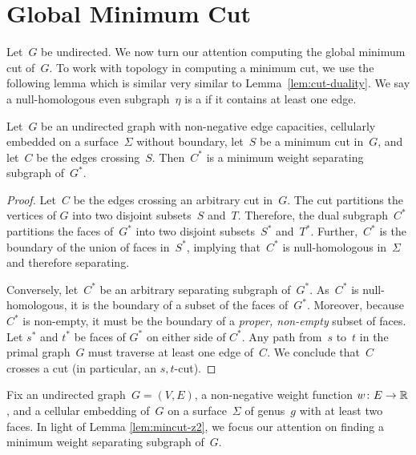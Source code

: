 \section{Global Minimum Cut}
\label{sec:global}

Let~$G$ be undirected. We now turn our attention computing the global minimum cut of~$G$.
To work with topology in computing a minimum cut, we use the following lemma which is similar very similar to Lemma~\ref{lem:cut-duality}.
We say a null-homologous even subgraph~$\eta$ is a  if it contains at least one edge.

\begin{lemma}
\label{lem:mincut-z2}
Let~$G$ be an undirected graph with non-negative edge capacities, cellularly embedded on a surface~$\Sigma$ without boundary, let~$S$ be a minimum cut in~$G$, and let~$C$ be the edges crossing~$S$.  Then~$C^*$ is a minimum weight separating subgraph of~$G^*$.
\end{lemma}

\begin{proof}
  Let~$C$ be the edges crossing an arbitrary cut in~$G$.  The cut partitions the vertices of $G$
  into two disjoint subsets~$S$ and~$T$. Therefore, the dual subgraph~$C^*$
  partitions the faces of~$G^*$ into two disjoint subsets~$S^*$ and~$T^*$.
  Further,~$C^*$ is the boundary of the union of faces in~$S^*$, implying
  that~$C^*$ is null-homologous in~$\Sigma$ and therefore separating.

  Conversely, let~$C^*$ be an arbitrary separating subgraph of~$G^*$.
  As~$C^*$ is null-homologous, it is the boundary of a subset of the faces
  of~$G^*$.  Moreover, because $C^*$ is non-empty, it must be the boundary of
  a \emph{proper, non-empty} subset of faces.  Let $s^*$ and $t^*$ be faces
  of $G^*$ on either side of $C^*$.  Any path from~$s$ to~$t$ in the primal
  graph~$G$ must traverse at least one edge of~$C$.  We conclude that~$C$ crosses
  a cut (in particular, an $s,t$-cut).
\end{proof}

Fix an undirected graph~$G=(V,E)$, a non-negative weight function ${w\colon E\to \mathbb{R}}$, and a cellular embedding of~$G$ on a surface~$\Sigma$ of genus~$g$ with at least two faces.  In light of Lemma \ref{lem:mincut-z2}, we focus our attention on finding a minimum weight separating subgraph of~$G$. 


